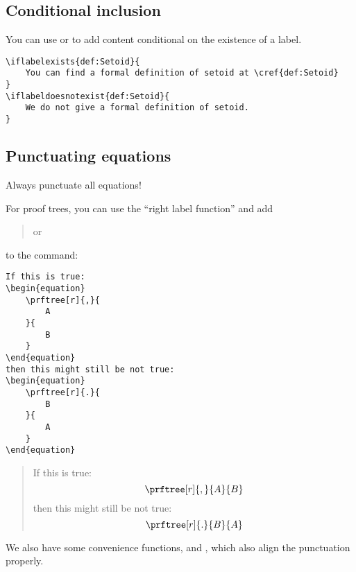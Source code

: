\subsection{Conditional inclusion}

You can use  or   to add content conditional on the existence of a label.

\begin{verbatim}
\iflabelexists{def:Setoid}{
    You can find a formal definition of setoid at \cref{def:Setoid}
}
\iflabeldoesnotexist{def:Setoid}{
    We do not give a formal definition of setoid.
}
\end{verbatim}

\subsection{Punctuating equations}

Always punctuate all equations!

For proof trees, you can use the ``right label function'' and add
%
\begin{quote}
    \centering
    \str{[r]{,}} \qquad or \qquad {}
\end{quote}
%
to the  command:
%
\begin{verbatim}
If this is true:
\begin{equation}
    \prftree[r]{,}{
        A
    }{
        B
    }
\end{equation}
then this might still be not true:
\begin{equation}
    \prftree[r]{.}{
        B
    }{
        A
    }
\end{equation}
\end{verbatim}
\begin{quote}
    If this is true:
    \begin{equation}
        \prftree[r]{,}{
            A
        }{
            B
        }
    \end{equation}
    then this might still be not true:
    \begin{equation}
        \prftree[r]{.
        }{
            B
        }{
            A
        }
    \end{equation}
\end{quote}

We also have some convenience functions, \str{\\prfperiod} and \str{\\prfcomma},
which also align the punctuation properly.

